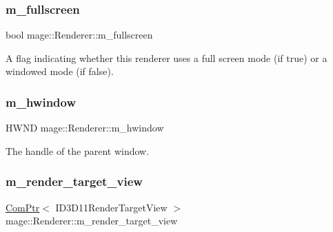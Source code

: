 \subsubsection{\texorpdfstring{m\+\_\+fullscreen}{m\_fullscreen}}
{\footnotesize\ttfamily bool mage\+::\+Renderer\+::m\+\_\+fullscreen\hspace{0.3cm}{\ttfamily [private]}}

A flag indicating whether this renderer uses a full screen mode (if {\ttfamily true}) or a windowed mode (if {\ttfamily false}). \hypertarget{classmage_1_1_renderer_afc314c8b146c3709edfd5349257a8387}{}\label{classmage_1_1_renderer_afc314c8b146c3709edfd5349257a8387} 
\subsubsection{\texorpdfstring{m\+\_\+hwindow}{m\_hwindow}}
{\footnotesize\ttfamily H\+W\+ND mage\+::\+Renderer\+::m\+\_\+hwindow\hspace{0.3cm}{\ttfamily [private]}}

The handle of the parent window. \hypertarget{classmage_1_1_renderer_a36ed728d4d5f55bc6f248066b2dd0a43}{}\label{classmage_1_1_renderer_a36ed728d4d5f55bc6f248066b2dd0a43} 
\subsubsection{\texorpdfstring{m\+\_\+render\+\_\+target\+\_\+view}{m\_render\_target\_view}}
{\footnotesize\ttfamily \hyperlink{namespacemage_ae74f374780900893caa5555d1031fd79}{Com\+Ptr}$<$ I\+D3\+D11\+Render\+Target\+View $>$ mage\+::\+Renderer\+::m\+\_\+render\+\_\+target\+\_\+view\hspace{0.3cm}{\ttfamily [private]}}

\hypertarget{classmage_1_1_renderer_ac4aa130b5e1ecd286f7ba05518f325f7}{}\label{classmage_1_1_renderer_ac4aa130b5e1ecd286f7ba05518f325f7} 
